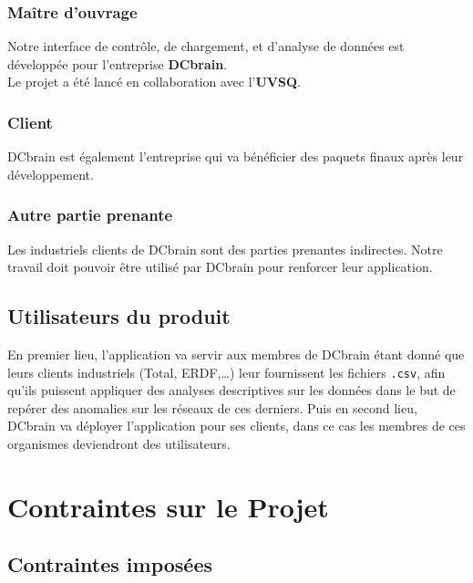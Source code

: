 			\subsubsection{Maître d'ouvrage}
			Notre interface de contrôle, de chargement, et d'analyse de données est développée pour l'entreprise \textbf{DCbrain}.\\
			Le projet a été lancé en collaboration avec l'\textbf{UVSQ}.
			
			\subsubsection{Client}
			DCbrain est également l'entreprise qui va bénéficier des paquets finaux après leur développement.
			
			\subsubsection{Autre partie prenante}
			Les industriels clients de DCbrain sont des parties prenantes indirectes. Notre travail doit pouvoir être utilisé par DCbrain pour renforcer leur application.
			
		\subsection{Utilisateurs du produit}
		En premier lieu, l’application va servir aux membres de DCbrain étant donné que leurs clients industriels (Total, ERDF,…) leur fournissent les fichiers \lstinline!.csv!, afin qu’ils puissent appliquer des analyses descriptives sur les données dans le but de repérer des anomalies sur les réseaux de ces derniers. Puis en second lieu, DCbrain va déployer l'application pour ses clients, dans ce cas les membres de ces organismes deviendront des utilisateurs.\\


	\section{Contraintes sur le Projet}
		\subsection{Contraintes imposées}
